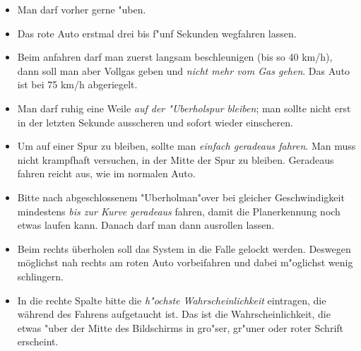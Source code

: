 \documentclass[a4paper,10pt]{scrartcl}
\begin{document}
\begin{itemize}
\item Man darf vorher gerne "uben.
\item Das rote Auto erstmal drei bis f"unf Sekunden wegfahren lassen.
\item Beim anfahren darf man zuerst langsam beschleunigen (bis so
    40 km/h), dann soll man aber Vollgas geben und {\em nicht mehr vom
    Gas gehen}.
    Das Auto ist bei 75 km/h abgeriegelt.
\item Man darf ruhig eine Weile {\em auf der "Uberholspur bleiben};
    man sollte nicht erst in der letzten Sekunde ausscheren
    und sofort wieder einscheren.
\item Um auf einer Spur zu bleiben, sollte man {\em einfach geradeaus
    fahren}. Man muss nicht krampfhaft versuchen, in der Mitte
    der Spur zu bleiben. Geradeaus fahren reicht aus,
    wie im normalen Auto.
\item Bitte nach abgeschlossenem "Uberholman"over bei gleicher
    Geschwindigkeit mindestens {\em bis zur Kurve geradeaus} fahren,
    damit die Planerkennung noch etwas laufen kann.
    Danach darf man dann ausrollen lassen.
\item Beim rechts \"uberholen soll das System in die Falle gelockt
    werden. Deswegen m\"oglichst nah rechts am roten Auto
    vorbeifahren und dabei m"oglichst wenig schlingern.
\item In die rechte Spalte bitte die {\em h"ochste Wahrscheinlichkeit}
    eintragen, die w\"ahrend des Fahrens aufgetaucht ist.
    Das ist die Wahrscheinlichkeit, die etwas "uber der Mitte des
    Bildschirms in gro"ser, gr"uner oder roter Schrift erscheint.
\end{itemize}
\end{document}

